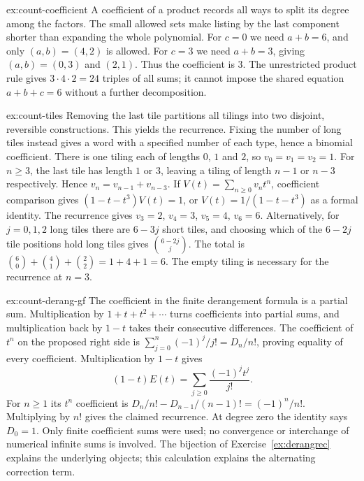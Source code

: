 \begin{solution}{ex:count-coefficient}
\idea A coefficient of a product records all ways to split its degree among the factors. The small allowed sets make listing by the last component shorter than expanding the whole polynomial.
\writeup For $c=0$ we need $a+b=6$, and only $(a,b)=(4,2)$ is allowed. For $c=3$ we need $a+b=3$, giving $(a,b)=(0,3)$ and $(2,1)$. Thus the coefficient is $3$. The unrestricted product rule gives $3\cdot4\cdot2=24$ triples of all sums; it cannot impose the shared equation $a+b+c=6$ without a further decomposition.
\end{solution}

\begin{solution}{ex:count-tiles}
\idea Removing the last tile partitions all tilings into two disjoint, reversible constructions. This yields the recurrence. Fixing the number of long tiles instead gives a word with a specified number of each type, hence a binomial coefficient.
\writeup There is one tiling each of lengths $0$, $1$ and $2$, so $v_0=v_1=v_2=1$. For $n\ge3$, the last tile has length $1$ or $3$, leaving a tiling of length $n-1$ or $n-3$ respectively. Hence $v_n=v_{n-1}+v_{n-3}$. If $V(t)=\sum_{n\ge0}v_nt^n$, coefficient comparison gives $(1-t-t^3)V(t)=1$, or $V(t)=1/(1-t-t^3)$ as a formal identity. The recurrence gives $v_3=2$, $v_4=3$, $v_5=4$, $v_6=6$. Alternatively, for $j=0,1,2$ long tiles there are $6-3j$ short tiles, and choosing which of the $6-2j$ tile positions hold long tiles gives $\binom{6-2j}{j}$. The total is $\binom60+\binom41+\binom22=1+4+1=6$. The empty tiling is necessary for the recurrence at $n=3$.
\end{solution}

\begin{solution}{ex:count-derang-gf}
\idea The coefficient in the finite derangement formula is a partial sum. Multiplication by $1+t+t^2+\cdots$ turns coefficients into partial sums, and multiplication back by $1-t$ takes their consecutive differences.
\writeup The coefficient of $t^n$ on the proposed right side is $\sum_{j=0}^n(-1)^j/j!=D_n/n!$, proving equality of every coefficient. Multiplication by $1-t$ gives
\[
(1-t)E(t)=\sum_{j\ge0}\frac{(-1)^jt^j}{j!}.
\]
For $n\ge1$ its $t^n$ coefficient is $D_n/n!-D_{n-1}/(n-1)!=(-1)^n/n!$. Multiplying by $n!$ gives the claimed recurrence. At degree zero the identity says $D_0=1$. Only finite coefficient sums were used; no convergence or interchange of numerical infinite sums is involved. The bijection of Exercise~\ref{ex:derangrec} explains the underlying objects; this calculation explains the alternating correction term.
\end{solution}

